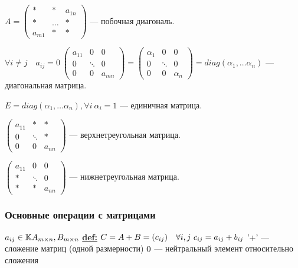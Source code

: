 \( A =
\begin{pmatrix}
    *      & *       & a_{1n} \\
    *      & \dots & *      \\
    a_{m1} & *       & *
\end{pmatrix}\) --- побочная диагональ.

\( \forall i \neq j \quad a_{ij} = 0\:
\begin{pmatrix}
    a_{11} & 0      & 0      \\
    0      & \ddots & 0      \\
    0      & 0      & a_{mn}
\end{pmatrix} =
\begin{pmatrix}
    \alpha_{1} & 0      & 0          \\
    0          & \ddots & 0          \\
    0          & 0      & \alpha_{n}
\end{pmatrix}
= diag(\alpha_1, \ldots \alpha_n)
\) --- диагональная матрица.

\( E = diag(\alpha_1, \ldots \alpha_n), \forall i\: \alpha_i=1\) --- единичная матрица.


\(
\begin{pmatrix}
    a_{11} & *      & *      \\
    0      & \ddots & *      \\
    0      & 0      & a_{nn}
\end{pmatrix}
\) --- верхнетреугольная матрица.

\(
\begin{pmatrix}
    a_{11} & 0      & 0      \\
    *      & \ddots & 0      \\
    *      & *      & a_{nn}
\end{pmatrix}
\) --- нижнетреугольная матрица.

\subsubsection{Основные операции с матрицами}
\(a_{ij} \in \mathbb{K} \newline
A_{m \times n}, B_{m \times n} \newline\)
\textbf{\underline{def:}} \( C = A + B = (c_{ij})\quad \forall i,j \  c_{ij}=a_{ij}+b_{ij} \newline\)
'+' --- сложение матриц (одной размерности)
\( \newline 0 \) --- нейтральный элемент относительно сложения


